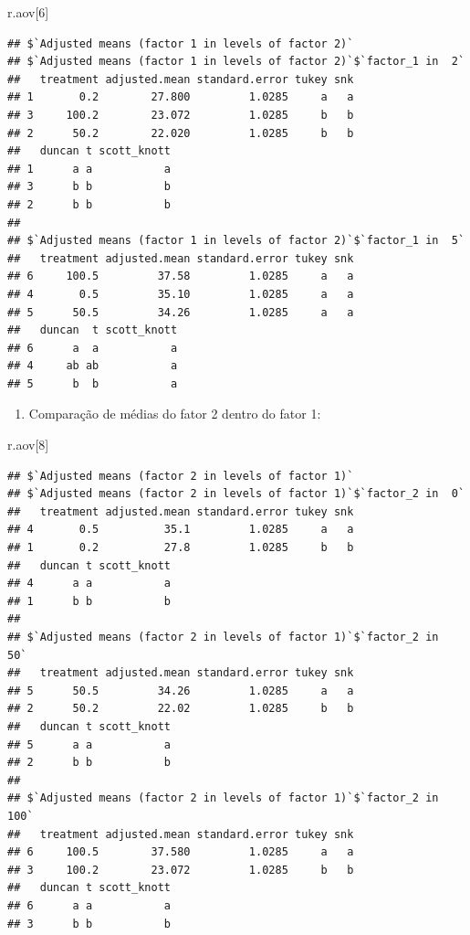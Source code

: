 \documentclass[
]{article}
\newenvironment{Shaded}{\begin{snugshade}}{\end{snugshade}}
\newcommand{\DecValTok}[1]{\textcolor[rgb]{0.00,0.00,0.81}{#1}}
\newcommand{\NormalTok}[1]{#1}
\providecommand{\tightlist}{%
  \setlength{\itemsep}{0pt}\setlength{\parskip}{0pt}}
\begin{document}
\begin{Shaded}
\begin{Highlighting}[]
\NormalTok{r.aov[}\DecValTok{6}\NormalTok{]}
\end{Highlighting}
\end{Shaded}

\begin{verbatim}
## $`Adjusted means (factor 1 in levels of factor 2)`
## $`Adjusted means (factor 1 in levels of factor 2)`$`factor_1 in  2`
##   treatment adjusted.mean standard.error tukey snk
## 1       0.2        27.800         1.0285     a   a
## 3     100.2        23.072         1.0285     b   b
## 2      50.2        22.020         1.0285     b   b
##   duncan t scott_knott
## 1      a a           a
## 3      b b           b
## 2      b b           b
## 
## $`Adjusted means (factor 1 in levels of factor 2)`$`factor_1 in  5`
##   treatment adjusted.mean standard.error tukey snk
## 6     100.5         37.58         1.0285     a   a
## 4       0.5         35.10         1.0285     a   a
## 5      50.5         34.26         1.0285     a   a
##   duncan  t scott_knott
## 6      a  a           a
## 4     ab ab           a
## 5      b  b           a
\end{verbatim}

\begin{enumerate}
\def\labelenumi{\arabic{enumi}.}
\setcounter{enumi}{1}
\tightlist
\item
  Comparação de médias do fator 2 dentro do fator 1:
\end{enumerate}

\begin{Shaded}
\begin{Highlighting}[]
\NormalTok{r.aov[}\DecValTok{8}\NormalTok{]}
\end{Highlighting}
\end{Shaded}

\begin{verbatim}
## $`Adjusted means (factor 2 in levels of factor 1)`
## $`Adjusted means (factor 2 in levels of factor 1)`$`factor_2 in  0`
##   treatment adjusted.mean standard.error tukey snk
## 4       0.5          35.1         1.0285     a   a
## 1       0.2          27.8         1.0285     b   b
##   duncan t scott_knott
## 4      a a           a
## 1      b b           b
## 
## $`Adjusted means (factor 2 in levels of factor 1)`$`factor_2 in  50`
##   treatment adjusted.mean standard.error tukey snk
## 5      50.5         34.26         1.0285     a   a
## 2      50.2         22.02         1.0285     b   b
##   duncan t scott_knott
## 5      a a           a
## 2      b b           b
## 
## $`Adjusted means (factor 2 in levels of factor 1)`$`factor_2 in  100`
##   treatment adjusted.mean standard.error tukey snk
## 6     100.5        37.580         1.0285     a   a
## 3     100.2        23.072         1.0285     b   b
##   duncan t scott_knott
## 6      a a           a
## 3      b b           b
\end{verbatim}
\end{document}
